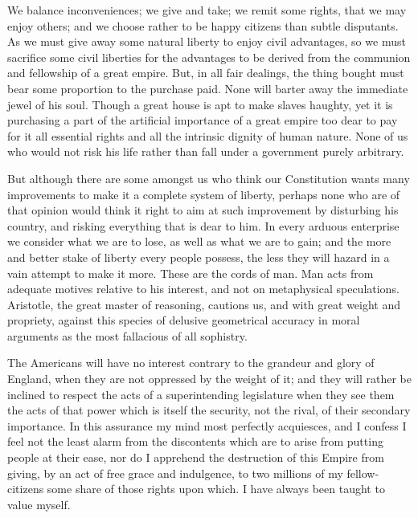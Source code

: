 We balance inconveniences; we give and take; we remit some rights, that we may enjoy others; and we choose rather to be happy citizens than subtle disputants. As we must give away some natural liberty to enjoy civil advantages, so we must sacrifice some civil liberties for the advantages to be derived from the communion and fellowship of a great empire. But, in all fair dealings, the thing bought must bear some proportion to the purchase paid. None will barter away the immediate jewel of his soul. Though a great house is apt to make slaves haughty, yet it is purchasing a part of the artificial importance of a great empire too dear to pay for it all essential rights and all the intrinsic dignity of human nature. None of us who would not risk his life rather than fall under a government purely arbitrary.\par

But although there are some amongst us who think our Constitution wants many improvements to make it a complete system of liberty, perhaps none who are of that opinion would think it right to aim at such improvement by disturbing his country, and risking everything that is dear to him. In every arduous enterprise we consider what we are to lose, as well as what we are to gain; and the more and better stake of liberty every people possess, the less they will hazard in a vain attempt to make it more. These are the cords of man. Man acts from adequate motives relative to his interest, and not on metaphysical speculations. Aristotle, the great master of reasoning, cautions us, and with great weight and propriety, against this species of delusive geometrical accuracy in moral arguments as the most fallacious of all sophistry.\par

The Americans will have no interest contrary to the grandeur and glory of England, when they are not oppressed by the weight of it; and they will rather be inclined to respect the acts of a superintending legislature when they see them the acts of that power which is itself the security, not the rival, of their secondary importance. In this assurance my mind most perfectly acquiesces, and I confess I feel not the least alarm from the discontents which are to arise from putting people at their ease, nor do I apprehend the destruction of this Empire from giving, by an act of free grace and indulgence, to two millions of my fellow-citizens some share of those rights upon which. I have always been taught to value myself.\par

